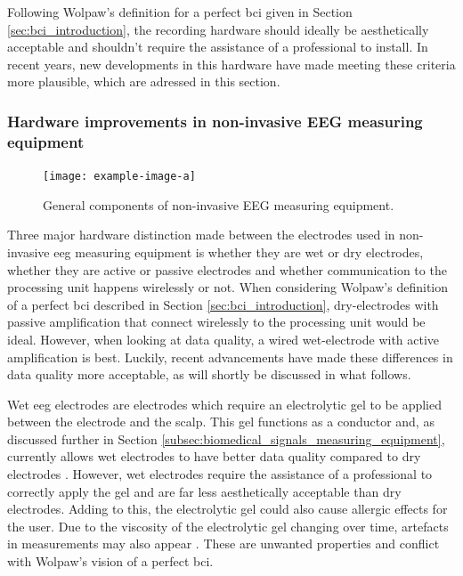 Following Wolpaw's definition for a perfect \gls{bci} given in Section \ref{sec:bci_introduction}, the recording hardware should ideally be aesthetically acceptable and shouldn't require the assistance of a professional to install.
In recent years, new developments in this hardware have made meeting these criteria more plausible, which are adressed in this section.


\subsubsection{Hardware improvements in non-invasive EEG measuring equipment}
\label{subsubsec:bci_gaining_popularity_better_measuring_hardware}


\begin{figure}[ht]
    \centering
    \texttt{[image: example-image-a]}
    \captionsetup{width=0.9\linewidth}
    \captionsetup{justification=centering}
    \caption{General components of non-invasive EEG measuring equipment.}
    \label{fig:general_eeg_measuring_components}
\end{figure}

Three major hardware distinction made between the electrodes used in non-invasive \gls{eeg} measuring equipment is whether they are wet or dry electrodes, whether they are active or passive electrodes and whether communication to the processing unit happens wirelessly or not.
When considering Wolpaw's definition of a perfect \gls{bci} described in Section \ref{sec:bci_introduction}, dry-electrodes with passive amplification that connect wirelessly to the processing unit would be ideal.
However, when looking at data quality, a wired wet-electrode with active amplification is best.
Luckily, recent advancements have made these differences in data quality more acceptable, as will shortly be discussed in what follows.

Wet \gls{eeg} electrodes are electrodes which require an electrolytic gel to be applied between the electrode and the scalp.
This gel functions as a conductor and, as discussed further in Section \ref{subsec:biomedical_signals_measuring_equipment}, currently allows wet electrodes to have better data quality compared to dry electrodes \citep{wet_vs_dry, dry_electrode_status, wet_dry_comparison_experiment}.
However, wet electrodes require the assistance of a professional to correctly apply the gel and are far less aesthetically acceptable than dry electrodes.
Adding to this, the electrolytic gel could also cause allergic effects for the user. Due to the viscosity of the electrolytic gel changing over time, artefacts in measurements may also appear \citep{dry_electrode_status}.
These are unwanted properties and conflict with Wolpaw's vision of a perfect \gls{bci}.


